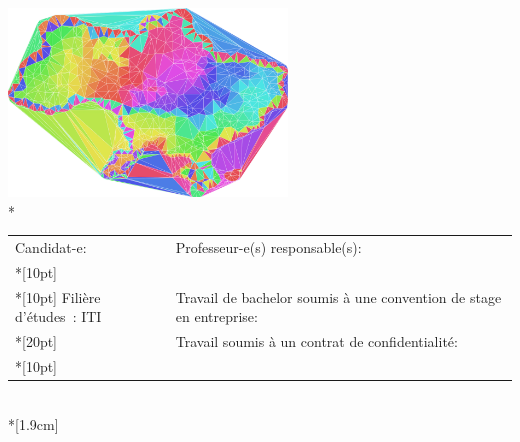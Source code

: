\begin{spacing}{0.956}
\vfill
\begin{center}
	{\includegraphics[width=280px]{figures/delaunator.png}}\\*
\vfill



{
	\begin{tabular*}{16cm}{p{7.59cm} p{7.58cm}}
		\small Candidat-e:					&	\small Professeur-e(s) responsable(s):\\*[10pt]
		\small\textbf{\textsc{\Author}}		&	\small\textbf{\textsc{\Professor}}\\*[10pt]
		\footnotesize  Filière d’études : ITI %
		\footnotesize  {} & \footnotesize  Travail de bachelor soumis à une convention de stage en entreprise: \Convention\\*[20pt]
		\footnotesize  {} & \footnotesize  Travail soumis à un contrat de confidentialité: \Confidentiel\\*[10pt]
	\end{tabular*}\\*[1.9cm]
}


\end{center}
\end{spacing}


